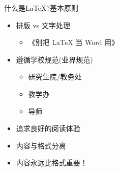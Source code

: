 \documentclass[fontset = adobe, xcolor=svgnames, t, aspectratio=169]{ctexbeamer}
\begin{document}
\begin{frame}{什么是\LaTeX?}{基本原则}
  \stretchon
  \begin{itemize}
  \item 排版 vs 文字处理
    \begin{itemize}
    \item 《别把 \LaTeX{} 当 Word 用》
    \end{itemize}
  \item 遵循\alert{学校规范}(业界规范)
    \begin{itemize}
    \item 研究生院/教务处
    \item 教学办
    \item 导师
    \end{itemize}
  \item 追求良好的阅读体验
  \item 内容与格式分离
  \item \alert{内容永远比格式重要！}
  \end{itemize}
  \stretchoff
\end{frame}
\end{document}
